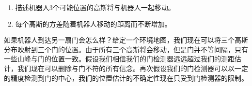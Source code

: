 \begin{enumerate}

\item 描述机器人3个可能位置的高斯将与机器人一起移动。
\item 每个高斯的方差随着机器人移动的距离而不断增加。
\end{enumerate}




如果机器人到达另一扇门会怎么样？给定一个环境地图，我们现在可以将三个高斯分布映射到三个门的位置。由于所有三个高斯将会移动，但是门并不等间隔，只有一些山峰与门的位置一致。假设我们相信我们的门检测器远远超过我们的测距估计，我们现在可以删除与门不符的所有信念。再次假设我们的门检测器可以以一定的精度检测到门的中心，我们的位置估计的不确定性现在只受到门检测器的限制。


